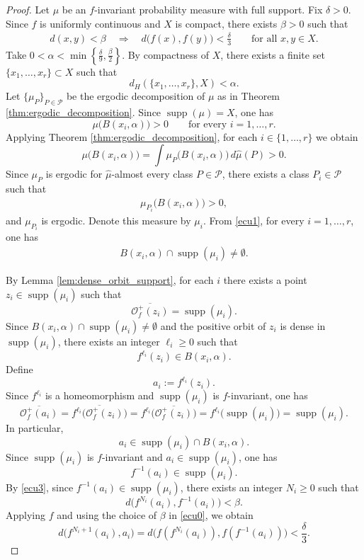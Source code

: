 \documentclass{amsart}
\numberwithin{equation}{section}
\theoremstyle{remark}
\DeclareMathOperator{\supp}{supp}
\begin{document}
\begin{proof}
Let $\mu$ be an $f$-invariant probability measure with full support. Fix $\delta>0$. Since $f$ is uniformly continuous and $X$ is compact, there exists $\beta>0$ such that
\begin{eqnarray}\label{ecu0}
d(x,y)<\beta
\quad\Longrightarrow\quad
d\bigl(f(x),f(y)\bigr)<\frac{\delta}{3}
\qquad\text{for all }x,y\in X.
\end{eqnarray}
Take $0<\alpha<\min \left\{\frac{\delta}{9},\frac{\beta}{2}\right\}$. By compactness of $X$, there exists a finite set $\{x_1,\dots,x_r\}\subset X$ such that
\[
d_H(\{x_1,\dots,x_r\},X)<\alpha.
\]
Let $\{\mu_P\}_{P\in\mathcal P}$ be the ergodic decomposition of $\mu$ as in Theorem \ref{thm:ergodic_decomposition}. Since $\supp(\mu)=X$, one has
\[
\mu\bigl(B(x_i,\alpha)\bigr)>0
\qquad\text{for every } i=1,\dots,r.
\]
Applying Theorem \ref{thm:ergodic_decomposition}, for each $i\in\{1,\dots,r\}$ we obtain
\[
\mu\bigl(B(x_i,\alpha)\bigr)
=
\int \mu_P\bigl(B(x_i,\alpha)\bigr)\,d\hat\mu(P)>0.
\]
Since $\mu_P$ is ergodic for $\hat\mu$-almost every class $P\in\mathcal P$, there exists a class $P_i\in\mathcal P$ such that
\begin{eqnarray}\label{ecu1}
\mu_{P_i}\bigl(B(x_i,\alpha)\bigr)>0,
\end{eqnarray}
and $\mu_{P_i}$ is ergodic. Denote this measure by $\mu_i$. From \eqref{ecu1}, for every $i=1,\ldots,r$, one has
\begin{eqnarray}\label{ecu2}
B(x_i,\alpha)\cap \supp(\mu_i)\neq\emptyset.
\end{eqnarray}

By Lemma \ref{lem:dense_orbit_support}, for each $i$ there exists a point $z_i\in \supp(\mu_i)$ such that
\[
\overline{\mathcal O_f^+(z_i)}=\supp(\mu_i).
\]
Since $B(x_i,\alpha)\cap \supp(\mu_i)\neq\emptyset$ and the positive orbit of $z_i$ is dense in $\supp(\mu_i)$, there exists an integer $\ell_i\ge0$ such that
\[
f^{\ell_i}(z_i)\in B(x_i,\alpha).
\]
Define
\[
a_i:=f^{\ell_i}(z_i).
\]
Since $f^{\ell_i}$ is a homeomorphism and $\supp(\mu_i)$ is $f$-invariant, one has
\begin{equation}\label{ecu3}
\overline{\mathcal O_f^+(a_i)}
=
\overline{f^{\ell_i}\bigl(\mathcal O_f^+(z_i)\bigr)}
=
f^{\ell_i}\bigl(\overline{\mathcal O_f^+(z_i)}\bigr)
=
f^{\ell_i}\bigl(\supp(\mu_i)\bigr)
=
\supp(\mu_i).
\end{equation}
In particular,
\[
a_i\in \supp(\mu_i)\cap B(x_i,\alpha).
\]
Since $\supp(\mu_i)$ is $f$-invariant and $a_i\in \supp(\mu_i)$, one has
\[
f^{-1}(a_i)\in \supp(\mu_i).
\]
By \eqref{ecu3}, since $f^{-1}(a_i)\in \supp(\mu_i)$, there exists an integer $N_i\ge0$ such that
\[
d\bigl(f^{N_i}(a_i),f^{-1}(a_i)\bigr)<\beta.
\]
Applying $f$ and using the choice of $\beta$ in \eqref{ecu0}, we obtain
\[
d\bigl(f^{N_i+1}(a_i),a_i\bigr)
=
d\bigl(f(f^{N_i}(a_i)),f(f^{-1}(a_i))\bigr)
<
\frac{\delta}{3}.
\]


\end{proof}
\end{document}
